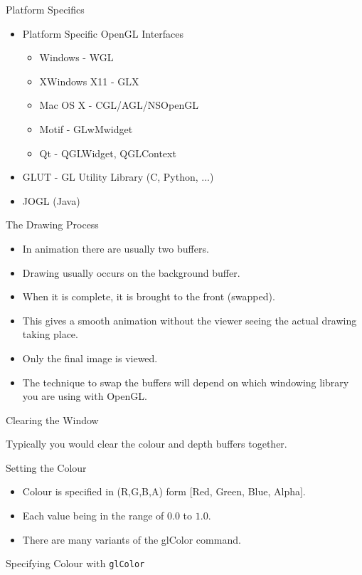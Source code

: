 \documentclass[xcolor=dvipsnames,t]{beamer}
\newcommand{\showcode}[1]{\begin{mdframed}[style=code] %
                          \end{mdframed}%
}
\begin{document}
\begin{frame}{Platform Specifics}
    \begin{itemize}
        \item Platform Specific OpenGL Interfaces
            \begin{itemize} 
                \item Windows - WGL
                \item XWindows X11 - GLX
                \item Mac OS X - CGL/AGL/NSOpenGL
                \item Motif - GLwMwidget
                \item Qt - QGLWidget, QGLContext
            \end{itemize} 
        \item GLUT - GL Utility Library (C, Python, ...)
        \item JOGL (Java)
    \end{itemize} 
\end{frame} 

\begin{frame}{The Drawing Process}
    \showcode{draw.c} 
    \begin{itemize} 
        \item In animation there are usually two buffers. 
        \item Drawing usually occurs on the background buffer. 
        \item When it is complete, it is brought to the front (swapped). 
        \item This gives a smooth animation without the viewer seeing the 
              actual drawing taking place. 
        \item Only the final image is viewed.
        \item The technique to swap the buffers will depend on which 
              windowing library you are using with OpenGL.
    \end{itemize} 
\end{frame} 

\begin{frame}{Clearing the Window} 
    \showcode{clearcolor.c} 
    Typically you would clear the colour and depth buffers together.
    \showcode{clear.c} 
\end{frame} 

\begin{frame}{Setting the Colour} 
    \begin{itemize}
        \item Colour is specified in (R,G,B,A) form [Red, Green, Blue, Alpha].
        \item Each value being in the range of $0.0$ to $1.0$.
        \item There are many variants of the glColor command.
    \end{itemize} 
    \begin{block}{Specifying Colour with \texttt{glColor}}
        \showcode{color.c} 
    \end{block} 
\end{frame} 
\end{document}
